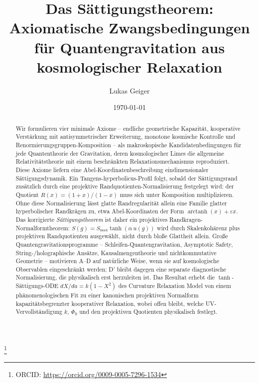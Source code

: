 \documentclass[aps,prd,twocolumn,superscriptaddress,nofootinbib]{revtex4-2}
\begin{document}

\title{Das Sättigungstheorem: Axiomatische Zwangsbedingungen\\für Quantengravitation aus kosmologischer Relaxation}

\author{Lukas Geiger}
\thanks{ORCID: \url{https://orcid.org/0009-0005-7296-1534}}

\date{\today}

\begin{abstract}
Wir formulieren vier minimale Axiome -- endliche geometrische Kapazität, kooperative Verstärkung mit antisymmetrischer Erweiterung, monotone kosmische Kontrolle und Renormierungsgruppen-Komposition -- als makroskopische Kandidatenbedingungen für jede Quantentheorie der Gravitation, deren kosmologischer Limes die allgemeine Relativitätstheorie mit einem beschränkten Relaxationsmechanismus reproduziert. Diese Axiome liefern eine Abel-Koordinatenbeschreibung eindimensionaler Sättigungsdynamik. Ein Tangens-hyperbolicus-Profil folgt, sobald der Sättigungsrand zusätzlich durch eine projektive Randquotienten-Normalisierung festgelegt wird: der Quotient $R(x)=(1+x)/(1-x)$ muss sich unter Komposition multiplizieren. Ohne diese Normalisierung lässt glatte Randregularität allein eine Familie glatter hyperbolischer Randkrägen zu, etwa Abel-Koordinaten der Form $\operatorname{arctanh}(x)+\varepsilon x$. Das korrigierte \textit{Sättigungstheorem} ist daher ein projektives Randkragen-Normalformtheorem: $S(g)=S_{\max}\tanh(\alpha\,u(g))$ wird durch Skalenkohärenz plus projektiven Randquotienten ausgewählt, nicht durch bloße Glattheit allein. Große Quantengravitationsprogramme -- Schleifen-Quantengravitation, Asymptotic Safety, String-/holographische Ansätze, Kausalmengentheorie und nichtkommutative Geometrie -- motivieren A--D auf natürliche Weise, wenn sie auf kosmologische Observablen eingeschränkt werden; D' bleibt dagegen eine separate diagnostische Normalisierung, die physikalisch erst herzuleiten ist. Das Resultat erhebt die $\tanh$-Sättigungs-ODE $dX/da = k(1-X^2)$ des Curvature Relaxation Model von einem phänomenologischen Fit zu einer kanonischen projektiven Normalform kapazitätsbegrenzter kooperativer Relaxation, wobei offen bleibt, welche UV-Vervollständigung $k$, $\Phi_0$ und den projektiven Quotienten physikalisch festlegt.
\end{abstract}
\end{document}
